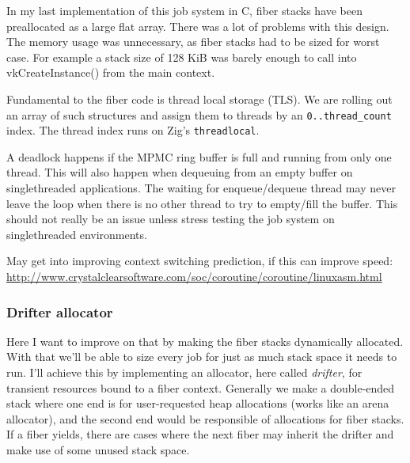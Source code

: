 In my last implementation of this job system in C, fiber stacks have been preallocated as a large flat array.
There was a lot of problems with this design. 
The memory usage was unnecessary, as fiber stacks had to be sized for worst case.
For example a stack size of 128 KiB was barely enough to call into vkCreateInstance() from the main context.

Fundamental to the fiber code is thread local storage (TLS). 
We are rolling out an array of such structures and assign them to threads by an \texttt{0..thread\_count} index.
The thread index runs on Zig's \texttt{threadlocal}. 

A deadlock happens if the MPMC ring buffer is full and running from only one thread.
This will also happen when dequeuing from an empty buffer on singlethreaded applications.
The waiting for enqueue/dequeue thread may never leave the loop 
when there is no other thread to try to empty/fill the buffer. 
This should not really be an issue unless stress testing the job system on singlethreaded environments.

May get into improving context switching prediction, if this can improve speed:
\url{http://www.crystalclearsoftware.com/soc/coroutine/coroutine/linuxasm.html}

\subsubsection{Drifter allocator}
Here I want to improve on that by making the fiber stacks dynamically allocated.
With that we'll be able to size every job for just as much stack space it needs to run.
I'll achieve this by implementing an allocator, here called \textit{drifter}, for transient resources bound to a fiber context.
Generally we make a double-ended stack where one end is for user-requested heap allocations (works like an arena allocator),
and the second end would be responsible of allocations for fiber stacks.
If a fiber yields, there are cases where the next fiber may inherit the drifter and make use of some unused stack space.

